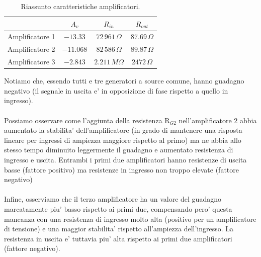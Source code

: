\documentclass[a4paper,10pt]{article}
\begin{document}
\begin{table}[h!]
\begin{center}
\begin{tabular}{ |c|c|c|c| } 
 \hline
   & $A_v$ & $R_{in}$ & $R_{out}$ \\ 
  \hline
 Amplificatore 1 & $-13.33$ & $ 72\,961\,\Omega$ & $87.69\,\Omega  $ \\ 
 Amplificatore 2 & $-11.068$ & $  82\,586\,\Omega$ & $ 89.87\,\Omega $ \\ 
 Amplificatore 3 & $-2.843$ & $ 2.211\,M\Omega $ & $ 2472\,\Omega $\\ 
 \hline
\end{tabular}
 \caption{Riassunto caratteristiche amplificatori.}
\label{tabella}
\end{center}
\end{table}
Notiamo che, essendo tutti e tre generatori a source comune, hanno guadagno negativo (il segnale in uscita e' in opposizione di fase rispetto a quello in ingresso). \\\\
Possiamo osservare come l'aggiunta della resistenza R$_{G2}$ nell'amplificatore 2 abbia aumentato la stabilita' dell'amplificatore (in grado di mantenere una risposta lineare per ingressi di ampiezza maggiore rispetto al primo) ma ne abbia allo stesso tempo diminuito leggermente il guadagno e aumentato resistenza di ingresso e uscita. Entrambi i primi due amplificatori hanno resistenze di uscita basse (fattore positivo) ma resistenze in ingresso non troppo elevate (fattore negativo) \\\\
Infine, osserviamo che il terzo amplificatore ha un valore del guadagno marcatamente piu' basso rispetto ai primi due, compensando pero' questa mancanza con una resistenza di ingresso molto alta (positivo per un amplificatore di tensione) e una maggior stabilita' rispetto all'ampiezza dell'ingresso. La resistenza in uscita e' tuttavia piu' alta rispetto ai primi due amplificatori (fattore negativo).
\end{document}
